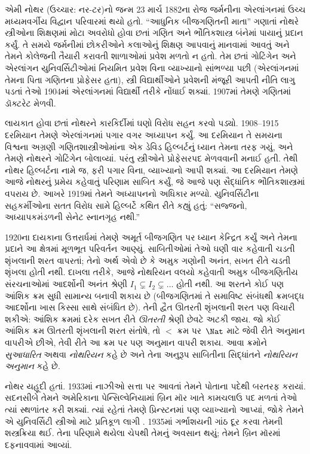 \documentclass[../../../include/open-logic-section]{subfiles}
\begin{document}



એમી નોથર (ઉચ્ચાર: નર-ટર)નો જન્મ 23 માર્ચ
1882ના રોજ જર્મનીના એરલાંગનમાં ઉચ્ચ
મધ્યમવર્ગીય વિદ્વાન પરિવારમાં થયો હતો.
“આધુનિક બીજગણિતની માતા” ગણાતાં નોથરે
સ્ત્રીઓના શિક્ષણમાં મોટા અવરોધો હોવા છતાં
ગણિત અને ભૌતિકશાસ્ત્ર બંનેમાં પાયાનું
પ્રદાન કર્યું. તે સમયે જર્મનીમાં છોકરીઓને
કલાઓનું શિક્ષણ આપવાનું માનવામાં આવતું અને
તેમને કોલેજની તૈયારી કરાવતી શાળાઓમાં
પ્રવેશ મળતો ન હતો. તેમ છતાં ગોટિંગેન
અને એરલાંગન યુનિવર્સિટીઓમાં નિયમિત
પ્રવેશ વિના વ્યાખ્યાનો સાંભળ્યા પછી
(એરલાંગનમાં તેમના પિતા ગણિતના પ્રોફેસર
હતા), સ્ત્રી વિદ્યાર્થીઓને પ્રવેશની
મંજૂરી આપતી નીતિ લાગુ પડતાં તેઓ
1904માં એરલાંગનમાં વિદ્યાર્થી તરીકે
નોંધાઈ શક્યાં. 1907માં તેમણે ગણિતમાં
ડૉક્ટરેટ મેળવી.

લાયકાત હોવા છતાં નોથરને કારકિર્દીમાં
ઘણો વિરોધ સહન કરવો પડ્યો. 1908--1915
દરમિયાન તેમણે એરલાંગનમાં પગાર વગર
અધ્યાપન કર્યું. આ દરમિયાન તે સમયના
વિશ્વના અગ્રણી ગણિતશાસ્ત્રીઓમાંના
એક ડેવિડ હિલ્બર્ટનું ધ્યાન તેમના
તરફ ગયું, અને તેમણે નોથરને ગોટિંગેન
બોલાવ્યાં. પરંતુ સ્ત્રીઓને પ્રોફેસરપદ
મેળવવાની મનાઈ હતી. તેથી નોથર
હિલ્બર્ટના નામે જ, ફરી પગાર વિના,
વ્યાખ્યાનો આપી શક્યાં. આ દરમિયાન
તેમણે આજે નોથરનું પ્રમેય કહેવાતું
પરિણામ સાબિત કર્યું, જે આજે પણ
સૈદ્ધાંતિક ભૌતિકશાસ્ત્રમાં વપરાય છે.
આખરે 1919માં તેમને અધ્યાપનનો
અધિકાર મળ્યો. યુનિવર્સિટીના
સહકર્મીઓના સતત વિરોધ સામે
હિલ્બર્ટે કથિત રીતે કહ્યું હતું:
“સજ્જનો, અધ્યાપકમંડળની સેનેટ
સ્નાનગૃહ નથી.”

1920ના દાયકાના ઉત્તરાર્ધમાં તેમણે
અમૂર્ત બીજગણિત પર ધ્યાન કેન્દ્રિત
કર્યું અને તેમના પ્રદાને આ ક્ષેત્રમાં
મૂળભૂત પરિવર્તન આણ્યું. સાબિતીઓમાં
તેઓ ઘણી વાર કહેવાતી ચડતી શૃંખલાની
શરત વાપરતાં; તેનો અર્થ એવો છે કે
અમુક ગણોની અનંત, સખત રીતે ચડતી
શૃંખલા હોતી નથી. દાખલા તરીકે,
આજે નોથરિયન વલયો કહેવાતી અમુક
બીજગણિતીય સંરચનાઓમાં આદર્શોની
અનંત શ્રેણી $I_1
\subsetneq I_2 \subsetneq \dots$
હોતી નથી. આ શરતને કોઈ પણ
આંશિક ક્રમ સુધી સામાન્ય બનાવી
શકાય છે (બીજગણિતમાં તે સમાવિષ્ટ
સંબંધથી ક્રમબદ્ધ આદર્શોના ખાસ
કિસ્સા સાથે સંબંધિત છે). તેની
દ્વૈત ઊતરતી શૃંખલાની શરત પણ
વિચારી શકીએ: આંશિક ક્રમમાં દરેક
સખત રીતે \emph{ઊતરતી} શ્રેણી
છેવટે અટકી જાય. જો કોઈ આંશિક
ક્રમ ઊતરતી શૃંખલાની શરત સંતોષે,
તો $<$ ક્રમ પર~$\Nat$ માટે
જેવી રીતે અનુમાન વાપરીએ છીએ,
તેવી રીતે આ ક્રમ પર પણ અનુમાન
વાપરી શકાય. આવા ક્રમોને
\emph{સુઆધારિત} અથવા
\emph{નોથરિયન} કહે છે અને
તેના અનુરૂપ સાબિતીના સિદ્ધાંતને
\emph{નોથરિયન અનુમાન} કહે છે.

નોથર યહૂદી હતાં. 1933માં નાઝીઓ
સત્તા પર આવતાં તેમને પોતાના
પદેથી બરતરફ કરાયાં. સદનસીબે
તેમને અમેરિકાના પેન્સિલ્વેનિયામાં
બ્રિન મૉર ખાતે કામચલાઉ પદ
મળતાં તેઓ ત્યાં સ્થળાંતર કરી
શક્યાં. ત્યાં રહેતાં તેમણે
પ્રિન્સ્ટનમાં પણ વ્યાખ્યાનો આપ્યાં,
જોકે તેમને એ યુનિવર્સિટી
સ્ત્રીઓ માટે પ્રતિકૂળ લાગી
\citep[81]{Dick1981}. 1935માં
ગર્ભાશયની ગાંઠ દૂર કરવા
તેમની શસ્ત્રક્રિયા થઈ. તેના
પરિણામે થયેલા ચેપથી તેમનું
અવસાન થયું; તેમને બ્રિન
મૉરમાં દફનાવવામાં આવ્યાં.
\end{document}
